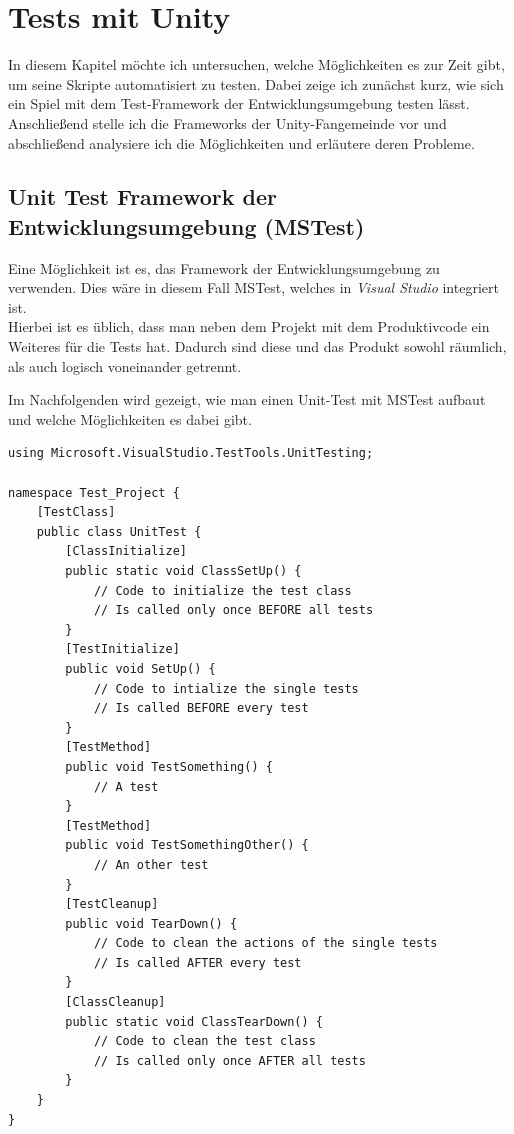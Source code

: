 \chapter{Tests mit Unity}
\label{sec:Tests mit Unity}

In diesem Kapitel möchte ich untersuchen, welche Möglichkeiten es zur Zeit gibt, um seine Skripte automatisiert zu testen. Dabei zeige ich zunächst kurz, wie sich ein Spiel mit dem Test-Framework der Entwicklungsumgebung testen lässt. Anschließend stelle ich die Frameworks der Unity-Fangemeinde vor und abschließend analysiere ich die Möglichkeiten und erläutere deren Probleme.

\section{Unit Test Framework der Entwicklungsumgebung (MSTest)}

Eine Möglichkeit ist es, das Framework der Entwicklungsumgebung zu verwenden. Dies wäre in diesem Fall MSTest, welches in \textit{Visual Studio} integriert ist.\\
Hierbei ist es üblich, dass man neben dem Projekt mit dem Produktivcode ein Weiteres für die Tests hat. Dadurch sind diese und das Produkt sowohl räumlich, als auch logisch voneinander getrennt.

Im Nachfolgenden wird gezeigt, wie man einen Unit-Test mit MSTest aufbaut und welche Möglichkeiten es dabei gibt.

\pagebreak
\begin{lstlisting}[caption={[Unit Test mit MSTest]Unit Test mit MSTest\\
Beispiel einer Testklasse in MSTest. Zeigt wie man ihre Testmethoden deklariert und wie sie initialisiert wird.}, label=code:UnitTestMitMSTest]
using Microsoft.VisualStudio.TestTools.UnitTesting;

namespace Test_Project {
	[TestClass]
	public class UnitTest {
		[ClassInitialize]
		public static void ClassSetUp() {
			// Code to initialize the test class
			// Is called only once BEFORE all tests
		}
		[TestInitialize]
		public void SetUp() {
			// Code to intialize the single tests
			// Is called BEFORE every test
		}
		[TestMethod]
		public void TestSomething() {
			// A test
		}			
		[TestMethod]
		public void TestSomethingOther() {
			// An other test
		}
		[TestCleanup]
		public void TearDown() {
			// Code to clean the actions of the single tests
			// Is called AFTER every test
		}
		[ClassCleanup]
		public static void ClassTearDown() {
			// Code to clean the test class
			// Is called only once AFTER all tests
		}
	}
}
\end{lstlisting}
\pagebreak

